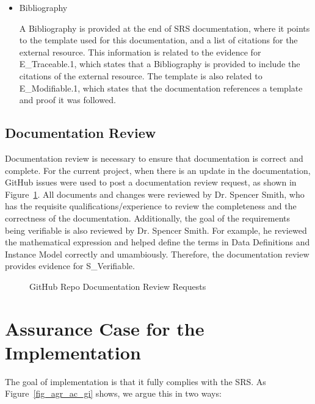 \begin{itemize}
\item Bibliography

A Bibliography is provided at the end of SRS documentation, where it points to the template \cite{Smith2006} used for this documentation, and a list of citations for the external resource. This information is related to the evidence for E\_Traceable.1, which states that a Bibliography is provided to include the citations of the external resource. The template is also related to E\_Modifiable.1, which states that the documentation references a template and proof it was followed.

\end{itemize}

\subsection{Documentation Review}

Documentation review is necessary to ensure that documentation is correct and complete. For the current project,  when there is an update in the documentation, GitHub issues were used to post a documentation review request, as shown in Figure~\ref{fig_agr_doc_review}. All documents and changes were reviewed by Dr. Spencer Smith, who has the requisite qualifications/experience to review the completeness and the correctness of the documentation. Additionally, the goal of the requirements being verifiable is also reviewed by Dr. Spencer Smith. For example, he reviewed the mathematical expression and helped define the terms in Data Definitions and Instance Model correctly and umambiously. Therefore, the documentation review provides evidence for S\_Verifiable.

\begin{figure}[H]
    \centering
    \caption[GitHub Repo Documentation Review Requests]{GitHub Repo Documentation Review Requests}
    \label{fig_agr_doc_review}
\end{figure}


\section{Assurance Case for the Implementation}
The goal of implementation is that it fully complies with the SRS. As Figure~\ref{fig_agr_ac_gi} shows, we argue this in two ways:


